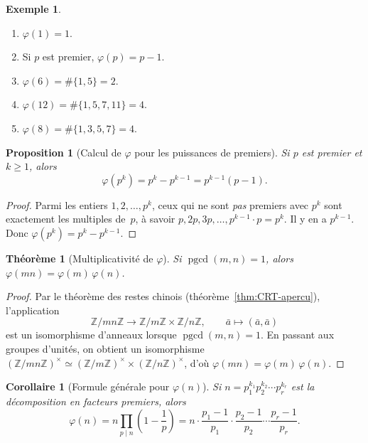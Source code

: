 \documentclass[12pt,a4paper,openany]{book}
\theoremstyle{definition}
\newtheorem{exemple}[definition]{Exemple}
\theoremstyle{plain}
\newtheorem{theoreme}[definition]{Théorème}
\newtheorem{proposition}[definition]{Proposition}
\newtheorem{corollaire}[definition]{Corollaire}
\theoremstyle{remark}
\newcommand{\Z}{\mathbb{Z}}
\DeclareMathOperator{\pgcd}{pgcd}
\begin{document}
\begin{exemple}
\label{ex:phi-petits}
\leavevmode
\begin{enumerate}[label=(\roman*)]
  \item $\varphi(1) = 1$.
  \item Si $p$ est premier, $\varphi(p) = p - 1$.
  \item $\varphi(6) = \#\{1, 5\} = 2$.
  \item $\varphi(12) = \#\{1, 5, 7, 11\} = 4$.
  \item $\varphi(8) = \#\{1, 3, 5, 7\} = 4$.
\end{enumerate}
\end{exemple}

\begin{proposition}[Calcul de $\varphi$ pour les puissances de premiers]
\label{prop:phi-prime-power}
Si $p$ est premier et $k \geqslant 1$, alors
\[
  \varphi(p^k) = p^k - p^{k-1} = p^{k-1}(p - 1).
\]
\end{proposition}

\begin{proof}
Parmi les entiers $1, 2, \ldots, p^k$, ceux qui ne sont \emph{pas} premiers avec
$p^k$ sont exactement les multiples de~$p$, à savoir $p, 2p, 3p, \ldots, p^{k-1} \cdot p = p^k$.
Il y en a $p^{k-1}$. Donc $\varphi(p^k) = p^k - p^{k-1}$.
\end{proof}

\begin{theoreme}[Multiplicativité de $\varphi$]
\label{thm:phi-mult}
Si $\pgcd(m, n) = 1$, alors $\varphi(mn) = \varphi(m)\,\varphi(n)$.
\end{theoreme}

\begin{proof}
Par le théorème des restes chinois (théorème~\ref{thm:CRT-apercu}), l'application
\[
  \Z/mn\Z \longrightarrow \Z/m\Z \times \Z/n\Z, \qquad
  \bar{a} \longmapsto (\bar{a}, \bar{a})
\]
est un isomorphisme d'anneaux lorsque $\pgcd(m, n) = 1$. En passant aux groupes
d'unités, on obtient un isomorphisme
$(\Z/mn\Z)^\times \simeq (\Z/m\Z)^\times \times (\Z/n\Z)^\times$,
d'où $\varphi(mn) = \varphi(m)\,\varphi(n)$.
\end{proof}

\begin{corollaire}[Formule générale pour $\varphi(n)$]
\label{cor:phi-formule}
Si $n = p_1^{k_1} p_2^{k_2} \cdots p_r^{k_r}$ est la décomposition en facteurs
premiers, alors
\[
  \varphi(n) = n \prod_{p \mid n} \left(1 - \frac{1}{p}\right)
  = n \cdot \frac{p_1 - 1}{p_1} \cdot \frac{p_2 - 1}{p_2} \cdots
    \frac{p_r - 1}{p_r}.
\]
\end{corollaire}
\end{document}
